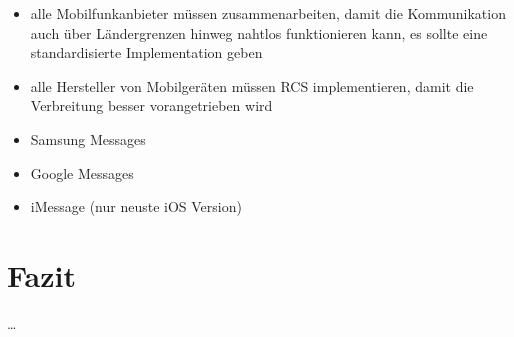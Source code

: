 \documentclass[conference]{IEEEtran}
\begin{document}
\begin{itemize}
    \item alle Mobilfunkanbieter müssen zusammenarbeiten, damit die Kommunikation auch über Ländergrenzen hinweg nahtlos funktionieren kann, es sollte eine standardisierte Implementation geben
    \item alle Hersteller von Mobilgeräten müssen RCS implementieren, damit die Verbreitung besser vorangetrieben wird
\end{itemize}
\cite{rcsmno}

\begin{itemize}
    \item Samsung Messages
    \item Google Messages
    \item iMessage (nur neuste iOS Version)
\end{itemize}

\section{Fazit}

\dots
\end{document}
